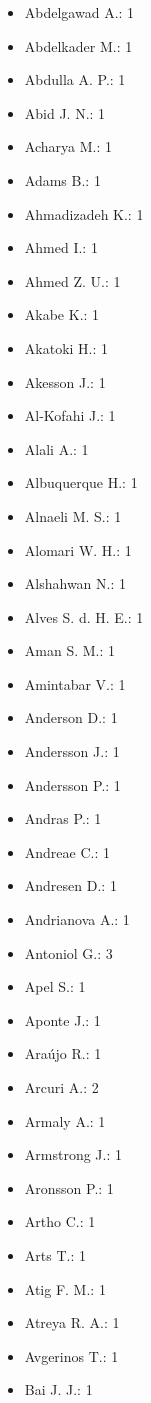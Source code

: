 \begin{itemize}
\item Abdelgawad A.: 1
\item Abdelkader M.: 1
\item Abdulla A. P.: 1
\item Abid J. N.: 1
\item Acharya M.: 1
\item Adams B.: 1
\item Ahmadizadeh K.: 1
\item Ahmed I.: 1
\item Ahmed Z. U.: 1
\item Akabe K.: 1
\item Akatoki H.: 1
\item Akesson J.: 1
\item Al-Kofahi J.: 1
\item Alali A.: 1
\item Albuquerque H.: 1
\item Alnaeli M. S.: 1
\item Alomari W. H.: 1
\item Alshahwan N.: 1
\item Alves S. d. H. E.: 1
\item Aman S. M.: 1
\item Amintabar V.: 1
\item Anderson D.: 1
\item Andersson J.: 1
\item Andersson P.: 1
\item Andras P.: 1
\item Andreae C.: 1
\item Andresen D.: 1
\item Andrianova A.: 1
\item Antoniol G.: 3
\item Apel S.: 1
\item Aponte J.: 1
\item Araújo R.: 1
\item Arcuri A.: 2
\item Armaly A.: 1
\item Armstrong J.: 1
\item Aronsson P.: 1
\item Artho C.: 1
\item Arts T.: 1
\item Atig F. M.: 1
\item Atreya R. A.: 1
\item Avgerinos T.: 1
\item Bai J. J.: 1

\end{itemize}
